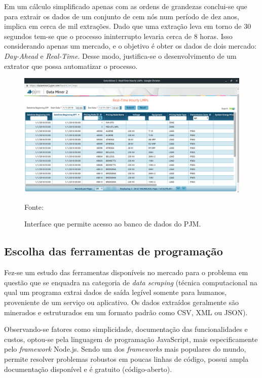 Em um cálculo simplificado apenas com as ordens de grandezas conclui-se que para extrair os dados de um conjunto de cem nós num período de dez anos, implica em cerca de mil extrações. Dado que uma extração leva em torno de 30 segundos tem-se que o processo ininterrupto levaria cerca de 8 horas. Isso considerando apenas um mercado, e o objetivo é obter os dados de dois mercado: \textit{Day-Ahead} e \textit{Real-Time}. Desse modo, justifica-se o desenvolvimento de um extrator que possa automatizar o processo.
\begin{figure}[tb]
	\caption{Interface que permite acesso ao banco de dados do PJM.}
	\begin{center}
	    \includegraphics[scale=.3]{figuras/interface_dataminer.png}
	\end{center}
   \begin{center}
      \footnotesize {Fonte: }
   \end{center}
    \label{fig:interface_dataminer}
\end{figure}
\subsection{Escolha das ferramentas de programação}
Fez-se um estudo das ferramentas disponíveis no mercado para o problema em questão que se enquadra na categoria de \textit{data scraping} (técnica computacional na qual um programa extrai dados de saída legível somente para humanos, proveniente de um serviço ou aplicativo. Os dados extraídos geralmente são minerados e estruturados em um formato padrão como CSV, XML ou JSON).

Observando-se fatores como simplicidade, documentação das funcionalidades e custos, optou-se pela linguagem de programação JavaScript, mais especificamente pelo \textit{framework} Node.js. Sendo um dos \textit{frameworks} mais populares do mundo, permite resolver problemas robustos em poucas linhas de código, possui ampla documentação disponível e é gratuito (código-aberto).


